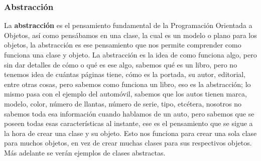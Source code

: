 \subsubsection{Abstracción}
La \textbf{abstracción} es el pensamiento fundamental de la Programación Orientada a Objetos, así como pensábamos en una clase, la cual es un modelo o plano para los objetos, la abstracción es ese pensamiento que nos permite comprender como funciona una clase y objeto. La abstracción es la idea de como funciona algo, pero sin dar detalles de cómo o qué es ese algo, sabemos qué es un libro, pero no tenemos idea de cuántas páginas tiene, cómo es la portada, su autor, editorial, entre otras cosas, pero sabemos como funciona un libro, eso es la abstracción; lo mismo pasa con el ejemplo del automóvil, sabemos que los autos tienen marca, modelo, color, número de llantas, número de serie, tipo, etcétera, nosotros no sabemos toda esa información cuando hablamos de un auto, pero sabemos que se poseen todas esas características al instante, ese es el pensamiento que se sigue a la hora de crear una clase y su objeto. Esto nos funciona para crear una sola clase para muchos objetos, en vez de crear muchas clases para sus respectivos objetos. Más adelante se verán ejemplos de clases abstractas.

